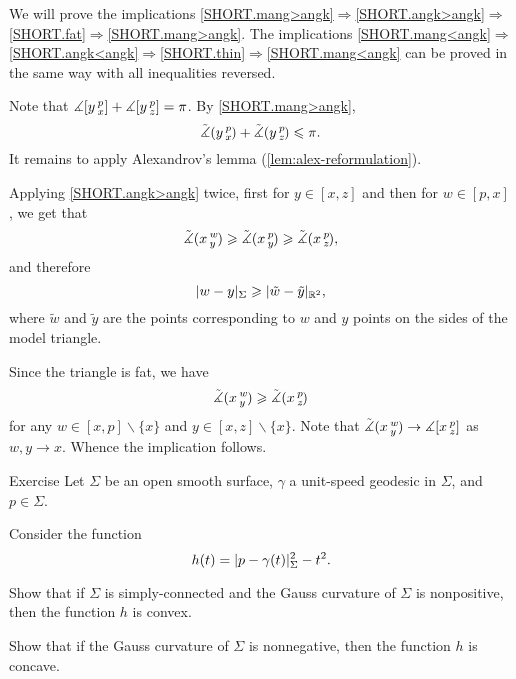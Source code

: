 We will prove the implications \ref{SHORT.mang>angk}$\Rightarrow$\ref{SHORT.angk>angk}$\Rightarrow$\ref{SHORT.fat}$\Rightarrow$\ref{SHORT.mang>angk}.
The implications \ref{SHORT.mang<angk}$\Rightarrow$\ref{SHORT.angk<angk}$\Rightarrow$\ref{SHORT.thin}$\Rightarrow$\ref{SHORT.mang<angk} can be proved in the same way with all inequalities reversed.

Note that $\measuredangle[y\,{}^{p}_{x}]+\measuredangle[y\,{}^{p}_{z}]=\pi$.
By \ref{SHORT.mang>angk}, 
\[\tilde\measuredangle(y\,{}^{p}_{x}\hspace{-0.2ex})+\tilde\measuredangle(y\,{}^{p}_{z}\hspace{-0.2ex})\leqslant \pi.\]
It remains to apply Alexandrov's lemma (\ref{lem:alex-reformulation}).

Applying \ref{SHORT.angk>angk} twice, first for $y\in [x,z]$ and then for $w\in [p,x]$, we get that
\[\tilde\measuredangle(x\,{}^{w}_{y}\hspace{-0.2ex}) \geqslant \tilde\measuredangle(x\,{}^{p}_{y}\hspace{-0.2ex}) \geqslant \tilde\measuredangle(x\,{}^{p}_{z}\hspace{-0.2ex}),\]
and therefore
\[\dist{w}{y}\Sigma\ge \dist{\tilde w}{\tilde y}{\mathbb{R}^2},\]
where $\tilde w$ and $\tilde y$ are the points corresponding to $w$ and $y$ points on the sides of the model triangle. 

Since the triangle is fat, we have 
\[\tilde\measuredangle(x\,{}^{w}_{y}\hspace{-0.2ex}) \geqslant \tilde\measuredangle(x\,{}^{p}_{z}\hspace{-0.2ex})\]
for any $w\in [x,p]\backslash \{x\}$ and $y\in [x,z]\backslash \{x\}$.
Note that $\tilde\measuredangle(x\,{}^{w}_{y}\hspace{-0.2ex})\to \measuredangle[x\,{}^{p}_{z}]$ as $w,y\to x$.
Whence the implication follows.
\qeds

\begin{thm}{Exercise}\label{ex:geod-convexity}
Let $\Sigma$ be an open smooth surface, 
 $\gamma$ a unit-speed geodesic in $\Sigma$, and $p\in\Sigma$.

Consider the function
\[h(t)=\dist{p}{\gamma(t)}\Sigma^2-t^2.\]

\begin{subthm}{}
Show that if $\Sigma$ is simply-connected and the Gauss curvature of $\Sigma$ is nonpositive, then the function $h$ is convex.
\end{subthm}

\begin{subthm}{} Show that if the Gauss curvature of $\Sigma$ is nonnegative, then the function $h$ is concave.
\end{subthm}

\end{thm}

